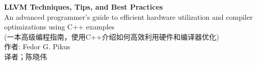 \documentclass[11pt,a4paper,UTF8]{book}
\begin{document}

\begin{center}
\thispagestyle{empty}
\newpage
\thispagestyle{empty}
\huge
\textbf{LLVM Techniques, Tips, and Best Practices} 
\\[9pt]
\normalsize
An advanced programmer's guide to efficient hardware utilization and compiler optimizations using C++ examples \\ 
(一本高级编程指南，使用C++介绍如何高效利用硬件和编译器优化)
\\[10pt]
\normalsize 
作者: Fedor G. Pikus
\\[8pt]
\normalsize
译者；陈晓伟
\end{center}
\end{document}
